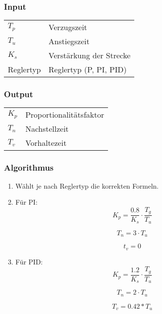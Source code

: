 \subsubsection*{Input}

\begin{tabular}{p{40mm}l}
    $ T_p $        & Verzugszeit \\
    $ T_u $        & Anstiegszeit \\
    $ K_s $        & Verst\"arkung der Strecke \\
      Reglertyp    & Reglertyp (P, PI, PID)
\end{tabular}

\subsubsection*{Output}
\begin{tabular}{p{40mm}l}
    $ K_p $ & Proportionalit\"atsfaktor \\
    $ T_n $ & Nachstellzeit \\
    $ T_v $ & Vorhaltezeit
\end{tabular}

\subsubsection*{Algorithmus}
\begin{enumerate}
    \item
        W\"ahlt je nach Reglertyp die korrekten Formeln.
    \item
        F\"ur PI:
        \begin{equation*}
             K_p= \frac{0.8}{K_s} \cdot \frac{T_g}{T_u}
        \end{equation*}

        \begin{equation*}
             T_n=3 \cdot T_u
        \end{equation*}

        \begin{equation*}
              t_v=0
        \end{equation*}
    \item
        F\"ur PID:
        \begin{equation*}
            K_p = \frac{1.2}{K_s} \cdot \frac{T_g}{T_u}
        \end{equation*}

        \begin{equation*}
            T_n=2 \cdot T_u
        \end{equation*}

        \begin{equation*}
            T_v=0.42*T_u
        \end{equation*}
\end{enumerate}


